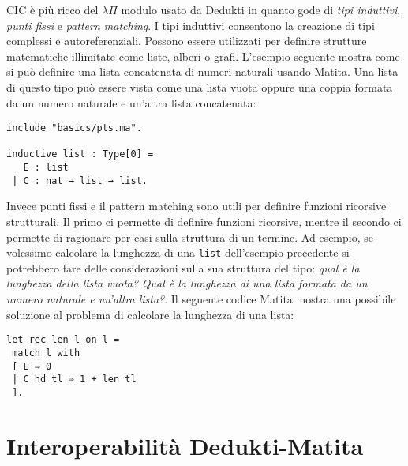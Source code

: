\documentclass[12pt,a4paper]{report}
\begin{document}
\begin{prooftree}
\end{prooftree}

\begin{prooftree}
\end{prooftree}


CIC è più ricco del $\lambda\Pi$ modulo usato da Dedukti in quanto gode di 
\textit{tipi induttivi}, \textit{punti fissi} e \textit{pattern matching}.
I tipi induttivi consentono la creazione di tipi complessi e autoreferenziali.
Possono essere utilizzati per definire strutture matematiche illimitate come liste,
alberi o grafi. L'esempio seguente mostra come si può definire una lista concatenata
di numeri naturali usando Matita. Una lista di questo tipo può essere vista come
una lista vuota oppure una coppia formata da un numero naturale e un'altra lista 
concatenata:

\begin{lstlisting}
include "basics/pts.ma".

inductive list : Type[0] =
   E : list
 | C : nat → list → list.

\end{lstlisting}

Invece punti fissi e il pattern matching sono utili per definire funzioni ricorsive
strutturali. Il primo ci permette di definire funzioni ricorsive, mentre il secondo
ci permette di ragionare per casi sulla struttura di un termine. Ad esempio, se
volessimo calcolare la lunghezza di una \texttt{list} dell'esempio precedente
si potrebbero fare delle considerazioni sulla sua struttura del tipo: \textit{qual è
la lunghezza della lista vuota?} \textit{Qual è la lunghezza di una lista formata 
da un numero naturale e un'altra lista?}. Il seguente codice Matita mostra una possibile
soluzione al problema di calcolare la lunghezza di una lista:

\begin{lstlisting}
let rec len l on l =
 match l with
 [ E ⇒ 0
 | C hd tl ⇒ 1 + len tl
 ].
\end{lstlisting}

\section{Interoperabilità Dedukti-Matita}
\end{document}
